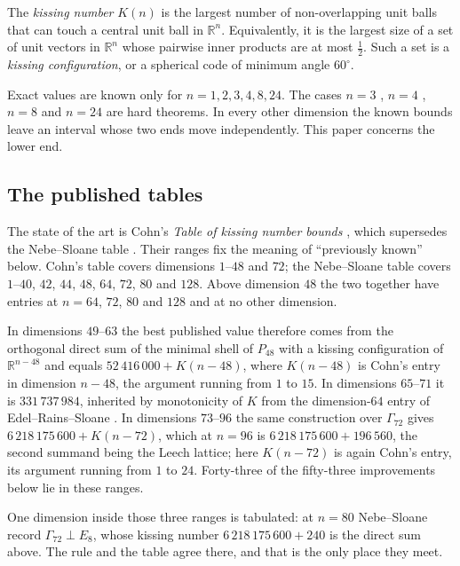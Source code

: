 \documentclass[11pt]{amsart}
\theoremstyle{remark}
\newcommand{\Pff}{P_{48}}
\newcommand{\Gsz}{\Gamma_{72}}
\newcommand{\R}{\mathbb{R}}
\begin{document}
The \emph{kissing number} $K(n)$ is the largest number of non-overlapping unit
balls that can touch a central unit ball in $\R^n$. Equivalently, it is the
largest size of a set of unit vectors in $\R^n$ whose pairwise inner products
are at most $\tfrac12$. Such a set is a \emph{kissing configuration}, or a
spherical code of minimum angle $60^\circ$.

Exact values are known only for $n=1,2,3,4,8,24$. The cases $n=3$
\cite{schutte-vanderwaerden1953}, $n=4$ \cite{musin2008}, $n=8$ and $n=24$
\cite{odlyzko-sloane1979,levenshtein1979} are hard theorems. In every other
dimension the known bounds leave an interval whose two ends move independently.
This paper concerns the lower end.

\subsection{The published tables}\label{ss:tables}

The state of the art is Cohn's \emph{Table of kissing number bounds}
\cite{cohn-table,cohn-data}, which supersedes the Nebe--Sloane table
\cite{nebe-sloane}. Their ranges fix the meaning of ``previously known'' below.
Cohn's table covers dimensions $1$--$48$ and $72$; the Nebe--Sloane table covers
$1$--$40$, $42$, $44$, $48$, $64$, $72$, $80$ and $128$. Above dimension $48$ the
two together have entries at $n=64$, $72$, $80$ and $128$ and at no other dimension.

In dimensions $49$--$63$ the best published value therefore comes from the
orthogonal direct sum of the minimal shell of $\Pff$ with a kissing configuration
of $\R^{n-48}$ and equals $52\,416\,000+K(n-48)$, where $K(n-48)$ is Cohn's entry in
dimension $n-48$, the argument running from $1$ to $15$. In dimensions $65$--$71$ it is
$331\,737\,984$, inherited by monotonicity of $K$ from the dimension-$64$ entry
of Edel--Rains--Sloane \cite{edel-rains-sloane1998}. In dimensions $73$--$96$ the
same construction over $\Gsz$ gives $6\,218\,175\,600+K(n-72)$, which at $n=96$ is
$6\,218\,175\,600+196\,560$, the second summand being the Leech lattice; here
$K(n-72)$ is again Cohn's entry, its argument running from $1$ to $24$. Forty-three of
the fifty-three improvements below lie in these ranges.

One dimension inside those three ranges is tabulated: at $n=80$ Nebe--Sloane record
$\Gsz\perp E_8$, whose kissing number $6\,218\,175\,600+240$ is the direct sum
above. The rule and the table agree there, and that is the only place they meet.
\end{document}
